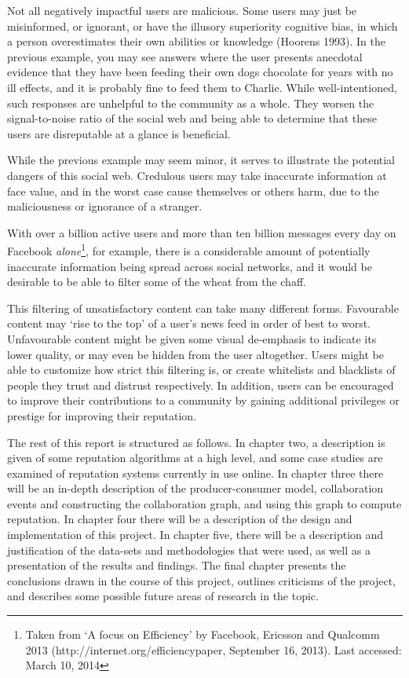 \documentclass[]{final_report}
\begin{document}
Not all negatively impactful users are malicious. Some users may just be misinformed, or ignorant, or have the illusory superiority cognitive bias, in which a person overestimates their own abilities or knowledge (Hoorens 1993). In the previous example, you may see answers where the user presents anecdotal evidence that they have been feeding their own dogs chocolate for years with no ill effects, and it is probably fine to feed them to Charlie. While well-intentioned, such responses are unhelpful to the community as a whole. They worsen the signal-to-noise ratio of the social web and being able to determine that these users are disreputable at a glance is beneficial.

While the previous example may seem minor, it serves to illustrate the potential dangers of this social web. Credulous users may take inaccurate information at face value, and in the worst case cause themselves or others harm, due to the maliciousness or ignorance of a stranger.


With over a billion active users and more than ten billion messages every day on Facebook \textsl{alone}\footnote{Taken from `A focus on Efficiency' by Facebook, Ericsson and Qualcomm 2013 (http://internet.org/efficiencypaper, September 16, 2013). Last accessed: March 10, 2014}, for example, there is a considerable amount of potentially inaccurate information being spread across social networks, and it would be desirable to be able to filter some of the wheat from the chaff.

This filtering of unsatisfactory content can take many different forms. Favourable content may `rise to the top' of a user's news feed in order of best to worst. Unfavourable content might be given some visual de-emphasis to indicate its lower quality, or may even be hidden from the user altogether. Users might be able to customize how strict this filtering is, or create whitelists and blacklists of people they trust and distrust respectively. In addition, users can be encouraged to improve their contributions to a community by gaining additional privileges or prestige for improving their reputation.

The rest of this report is structured as follows. In chapter two, a description is given of some reputation algorithms at a high level, and some case studies are examined of reputation systems currently in use online. In chapter three there will be an in-depth description of the producer-consumer model, collaboration events and constructing the collaboration graph, and using this graph to compute reputation. In chapter four there will be a description of the design and implementation of this project. In chapter five, there will be a description and justification of the data-sets and methodologies that were used, as well as a presentation of the results and findings. The final chapter presents the conclusions drawn in the course of this project, outlines criticisms of the project, and describes some possible future areas of research in the topic.
\end{document}
